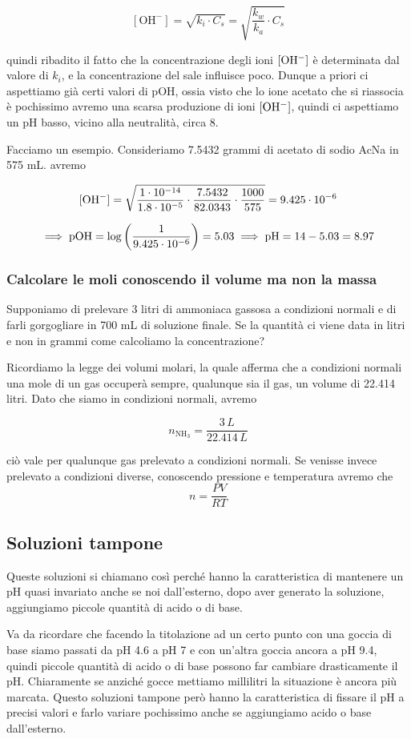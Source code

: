 $$[\text{OH}^-]=\sqrt{k_i \cdot C_s}=\sqrt{\frac{k_w}{k_a}\cdot C_s}$$

\E quindi ribadito il fatto che la concentrazione degli ioni $\rm [OH^-]$ è determinata dal valore di $k_i$, e la concentrazione del sale influisce poco. Dunque a priori ci aspettiamo già certi valori di pOH, ossia visto che lo ione acetato che si riassocia è pochissimo avremo una scarsa produzione di ioni $\rm [OH^-]$, quindi ci aspettiamo un pH basso, vicino alla neutralità, circa 8.

Facciamo un esempio. Consideriamo 7.5432 grammi di acetato di sodio AcNa in 575 mL. avremo

$$\rm [OH^-]=\sqrt{\frac{1 \cdot 10^{-14}}{1.8 \cdot 10^{-5}}\cdot \frac{7.5432}{82.0343} \cdot \frac{1000}{575}}=9.425 \cdot 10^{-6}$$

$$\implies \rm pOH = \log \left( \frac{1}{9.425 \cdot 10^{-6}} \right)=5.03 \implies pH= 14-5.03=8.97$$
\subsubsection{Calcolare le moli conoscendo il volume ma non la massa}
Supponiamo di prelevare 3 litri di ammoniaca gassosa a condizioni normali e di farli gorgogliare in 700 mL di soluzione finale. Se la quantità ci viene data in litri e non in grammi come calcoliamo la concentrazione?

Ricordiamo la legge dei volumi molari, la quale afferma che a condizioni normali una mole di un gas occuperà sempre, qualunque sia il gas, un volume di 22.414 litri. Dato che siamo in condizioni normali, avremo

$$n_{\text{NH}_3}=\frac{3 \, L}{22.414 \, L}$$

ciò vale per qualunque gas prelevato a condizioni normali. Se venisse invece prelevato a condizioni diverse, conoscendo pressione e temperatura avremo che
$$n=\frac{PV}{RT}$$
\subsection{Soluzioni tampone}
Queste soluzioni si chiamano così perché hanno la caratteristica di mantenere un pH quasi invariato anche se noi dall'esterno, dopo aver generato la soluzione, aggiungiamo piccole quantità di acido o di base.

Va da ricordare che facendo la titolazione ad un certo punto con una goccia di base siamo passati da pH 4.6 a pH 7 e con un'altra goccia ancora a pH 9.4, quindi piccole quantità di acido o di base possono far cambiare drasticamente il pH. Chiaramente se anziché gocce mettiamo millilitri la situazione è ancora più marcata. Questo soluzioni tampone però hanno la caratteristica di fissare il pH a precisi valori e farlo variare pochissimo anche se aggiungiamo acido o base dall'esterno.

